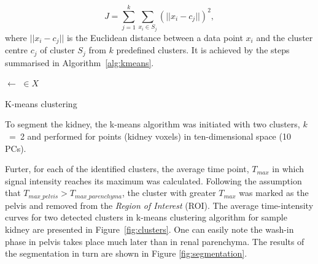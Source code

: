 \begin{equation}
	\label{eq:kmeans}
	J = \sum_{j=1}^{k}\sum_{x_i \in S_j}(||x_i-c_j||)^2,
\end{equation}
where $||x_i-c_j||$ is  the Euclidean distance between a data point $x_i$ and the cluster centre $c_j$ of cluster $S_j$ from $k$ predefined clusters. It is achieved by the steps summarised in Algorithm~\ref{alg:kmeans}.

\vspace{16pt}
\begin{algorithm}[H]
\footnotesize
    
	
    
    \BlankLine
    \BlankLine
    
    
	\DontPrintSemicolon
	\Centroids $\leftarrow$  \Centroids$\in X$\;
    
	  
    
    
    \caption{K-means clustering}
    \label{alg:kmeans}
\end{algorithm}

\vspace{16pt}
To segment the kidney, the k-means algorithm was initiated with two clusters, $k$~=~2 and performed for points (kidney voxels) in ten-dimensional space (10 PCs).

Furter, for each of the identified clusters, the average time point, $T_{max}$ in which signal intensity reaches its maximum was calculated. 
Following the assumption that $T_{max\_pelvis}>T_{max\_parenchyma}$, the cluster with greater $T_{max}$ was marked as the pelvis and removed from the \textit{Region of Interest} (ROI).
The average time-intensity curves for two detected clusters in k-means clustering algorithm for sample kidney are presented in Figure~\ref{fig:clusters}. One can easily note the wash-in phase in pelvis takes place much later than in renal parenchyma. The results of the segmentation in turn are shown in Figure \ref{fig:segmentation}.  


